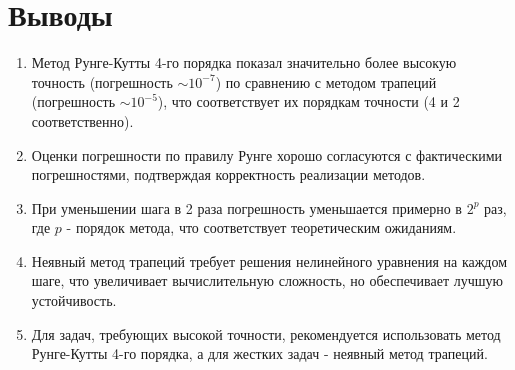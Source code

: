\documentclass[12pt,a4paper]{article}
\begin{document}
\section{Выводы}
\begin{enumerate}
\item Метод Рунге-Кутты 4-го порядка показал значительно более высокую точность (погрешность $\sim 10^{-7}$) по сравнению с методом трапеций (погрешность $\sim 10^{-5}$), что соответствует их порядкам точности (4 и 2 соответственно).

\item Оценки погрешности по правилу Рунге хорошо согласуются с фактическими погрешностями, подтверждая корректность реализации методов.

\item При уменьшении шага в 2 раза погрешность уменьшается примерно в $2^p$ раз, где $p$ - порядок метода, что соответствует теоретическим ожиданиям.

\item Неявный метод трапеций требует решения нелинейного уравнения на каждом шаге, что увеличивает вычислительную сложность, но обеспечивает лучшую устойчивость.

\item Для задач, требующих высокой точности, рекомендуется использовать метод Рунге-Кутты 4-го порядка, а для жестких задач - неявный метод трапеций.
\end{enumerate}


\newpage
\end{document}
